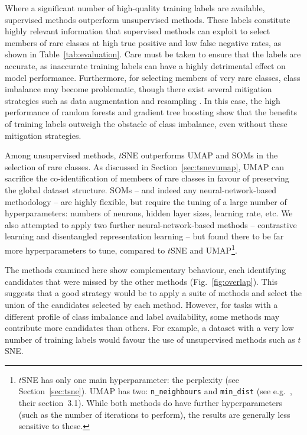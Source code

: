 \documentclass[fleqn,usenatbib]{rasti}
\begin{document}
Where a significant number of high-quality training labels are available, supervised methods outperform unsupervised methods.
These labels constitute highly relevant information that supervised methods can exploit to select members of rare classes at high true positive and low false negative rates, as shown in Table~\ref{tab:evaluation}.
Care must be taken to ensure that the labels are accurate, as inaccurate training labels can have a highly detrimental effect on model performance.
Furthermore, for selecting members of very rare classes, class imbalance may become problematic, though there exist several mitigation strategies such as data augmentation and resampling \citep[see also][]{vincent25}.
In this case, the high performance of random forests and gradient tree boosting show that the benefits of training labels outweigh the obstacle of class imbalance, even without these mitigation strategies.

Among unsupervised methods, $t$SNE outperforms UMAP and SOMs in the selection of rare classes.
As discussed in Section~\ref{sec:tsnevumap}, UMAP can sacrifice the co-identification of members of rare classes in favour of preserving the global dataset structure.
SOMs -- and indeed any neural-network-based methodology -- are highly flexible, but require the tuning of a large number of hyperparameters: numbers of neurons, hidden layer sizes, learning rate, etc.
We also attempted to apply two further neural-network-based methods -- contrastive learning \citep{chen20} and disentangled representation learning \citep[e.g.][]{wang24} -- but found there to be far more hyperparameters to tune, compared to $t$SNE and UMAP\footnote{
    $t$SNE has only one main hyperparameter: the perplexity (see Section~\ref{sec:tsne}).
    UMAP has two: \texttt{n\_neighbours} and \texttt{min\_dist} (see e.g.\ \citet{kao24}, their section~3.1).
    While both methods do have further hyperparameters (such as the number of iterations to perform), the results are generally less sensitive to these.
}.

The methods examined here show complementary behaviour, each identifying candidates that were missed by the other methods (Fig.~\ref{fig:overlap}).
This suggests that a good strategy would be to apply a suite of methods and select the union of the candidates selected by each method.
However, for tasks with a different profile of class imbalance and label availability, some methods may contribute more candidates than others.
For example, a dataset with a very low number of training labels would favour the use of unsupervised methods such as $t$SNE.
\end{document}
